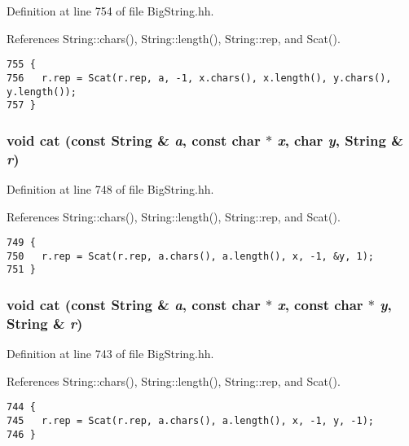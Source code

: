 Definition at line 754 of file Big\-String.hh.

References String::chars(), String::length(), String::rep, and Scat().



\footnotesize\begin{verbatim}755 {
756   r.rep = Scat(r.rep, a, -1, x.chars(), x.length(), y.chars(), y.length());
757 }
\end{verbatim}\normalsize 
{}
\subsubsection{\setlength{\rightskip}{0pt plus 5cm}void cat (const {\bf String} \& {\em a}, const char $\ast$ {\em x}, char {\em y}, {\bf String} \& {\em r})\hspace{0.3cm}{\tt  [inline]}}\label{BigString_8hh_a57}




Definition at line 748 of file Big\-String.hh.

References String::chars(), String::length(), String::rep, and Scat().



\footnotesize\begin{verbatim}749 {
750   r.rep = Scat(r.rep, a.chars(), a.length(), x, -1, &y, 1);
751 }
\end{verbatim}\normalsize 
{}
\subsubsection{\setlength{\rightskip}{0pt plus 5cm}void cat (const {\bf String} \& {\em a}, const char $\ast$ {\em x}, const char $\ast$ {\em y}, {\bf String} \& {\em r})\hspace{0.3cm}{\tt  [inline]}}\label{BigString_8hh_a56}




Definition at line 743 of file Big\-String.hh.

References String::chars(), String::length(), String::rep, and Scat().



\footnotesize\begin{verbatim}744 {
745   r.rep = Scat(r.rep, a.chars(), a.length(), x, -1, y, -1);
746 }
\end{verbatim}\normalsize 
{}
